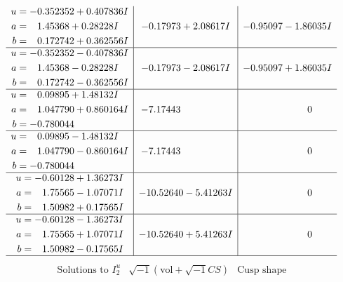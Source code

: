 \documentclass[1p]{elsarticle_modified}
\theoremstyle{definition}
\newcommand{\I}{\sqrt{-1}}
\begin{document}
$$\begin{array}{c|c|c}
\begin{aligned}
u &= -0.352352 + 0.407836 I \\
a &= \phantom{-}1.45368 + 0.28228 I \\
b &= \phantom{-}0.172742 + 0.362556 I\end{aligned}
 & -0.17973 + 2.08617 I & -0.95097 - 1.86035 I \\ \hline\begin{aligned}
u &= -0.352352 - 0.407836 I \\
a &= \phantom{-}1.45368 - 0.28228 I \\
b &= \phantom{-}0.172742 - 0.362556 I\end{aligned}
 & -0.17973 - 2.08617 I & -0.95097 + 1.86035 I \\ \hline\begin{aligned}
u &= \phantom{-}0.09895 + 1.48132 I \\
a &= \phantom{-}1.047790 + 0.860164 I \\
b &= -0.780044\phantom{ +0.000000I}\end{aligned}
 & -7.17443\phantom{ +0.000000I} & \phantom{-0.000000 } 0 \\ \hline\begin{aligned}
u &= \phantom{-}0.09895 - 1.48132 I \\
a &= \phantom{-}1.047790 - 0.860164 I \\
b &= -0.780044\phantom{ +0.000000I}\end{aligned}
 & -7.17443\phantom{ +0.000000I} & \phantom{-0.000000 } 0 \\ \hline\begin{aligned}
u &= -0.60128 + 1.36273 I \\
a &= \phantom{-}1.75565 - 1.07071 I \\
b &= \phantom{-}1.50982 + 0.17565 I\end{aligned}
 & -10.52640 - 5.41263 I & \phantom{-0.000000 } 0 \\ \hline\begin{aligned}
u &= -0.60128 - 1.36273 I \\
a &= \phantom{-}1.75565 + 1.07071 I \\
b &= \phantom{-}1.50982 - 0.17565 I\end{aligned}
 & -10.52640 + 5.41263 I & \phantom{-0.000000 } 0\\
 \hline 
 \end{array}$$\newpage$$\begin{array}{c|c|c}  
\text{Solutions to }I^u_{2}& \I (\text{vol} + \sqrt{-1}CS) & \text{Cusp shape}\\
 \hline 
\begin{aligned}

\end{aligned}
\end{array}$$
\end{document}
